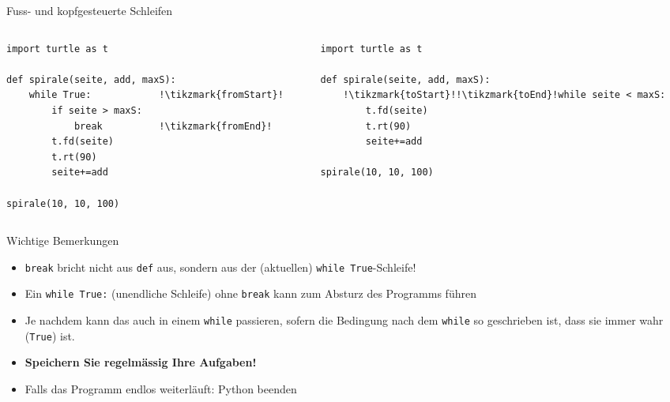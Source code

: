 \begin{frame}[fragile]{Fuss- und kopfgesteuerte Schleifen}
    \begin{columns}
        \begin{column}{.47\textwidth}
            \begin{lstlisting}[escapechar=!,basicstyle=\footnotesize\ttfamily]
import turtle as t

def spirale(seite, add, maxS):
    while True:            !\tikzmark{fromStart}!
    	if seite > maxS:
    	    break          !\tikzmark{fromEnd}!
        t.fd(seite)
        t.rt(90)
        seite+=add

spirale(10, 10, 100)
\end{lstlisting}
        \end{column}
        \begin{column}{.5\textwidth}
            \begin{lstlisting}[escapechar=!,basicstyle=\footnotesize\ttfamily]
import turtle as t

def spirale(seite, add, maxS):
    !\tikzmark{toStart}!!\tikzmark{toEnd}!while seite < maxS:
        t.fd(seite)
        t.rt(90)
        seite+=add
        
spirale(10, 10, 100)
\end{lstlisting}
        \end{column}
    \end{columns}

\end{frame}

\begin{frame}[fragile]{Wichtige Bemerkungen}
    \begin{itemize}[<+->]
        \item \lstinline|break| bricht nicht aus \lstinline|def| aus, sondern aus der (aktuellen) \lstinline|while True|-Schleife!
        \item Ein \lstinline|while True:| (unendliche Schleife) ohne \lstinline|break| kann zum Absturz des Programms führen 
        \item Je nachdem kann das auch in einem \lstinline|while| passieren, sofern die Bedingung nach dem \lstinline|while| so geschrieben ist, dass sie immer wahr (\lstinline|True|) ist.
        \item \textbf{Speichern Sie regelmässig Ihre Aufgaben!}
        \item Falls das Programm endlos weiterläuft: Python beenden \faTrash
    \end{itemize}
\end{frame}

